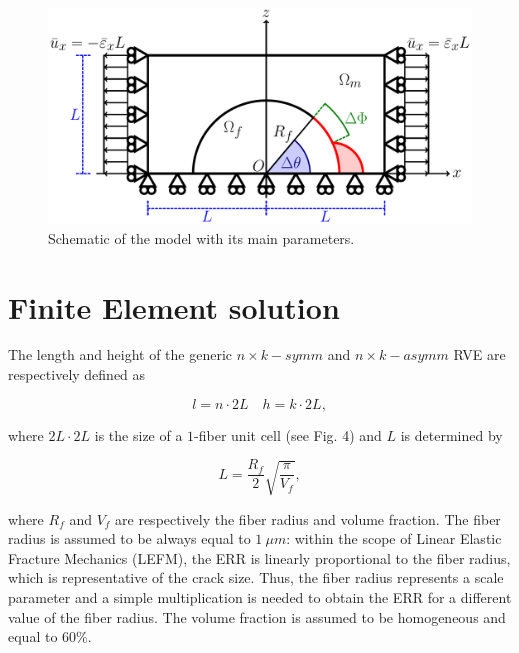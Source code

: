 \begin{figure}[!htb]
\centering
  \includegraphics[height=0.225\textheight]{paperD/RUC.pdf}
\caption{Schematic of the model with its main parameters.}\label{paperD:fig:ruc}
\end{figure}


\section{Finite Element solution}

The length and height of the generic $n \times k-symm$ and $n \times k-asymm$ RVE are respectively defined as

\begin{equation}
l=n\cdot2L\quad h=k\cdot2L,
\end{equation}

where $2L\cdot2L$ is the size of a $1$-fiber unit cell (see Fig. 4) and $L$ is determined by

\begin{equation}
L=\frac{R_{f}}{2}\sqrt{\frac{\pi}{V_{f}}},
\end{equation}

where $R_{f}$ and $V_{f}$ are respectively the fiber radius and volume fraction. The fiber radius is assumed to be always equal to $1\ μm$: within the scope of Linear Elastic Fracture Mechanics (LEFM), the ERR is linearly proportional to the fiber radius, which is representative of the crack size. Thus, the fiber radius represents a scale parameter and a simple multiplication is needed to obtain the ERR for a different value of the fiber radius. The volume fraction is assumed to be homogeneous and equal to $60\%$.

